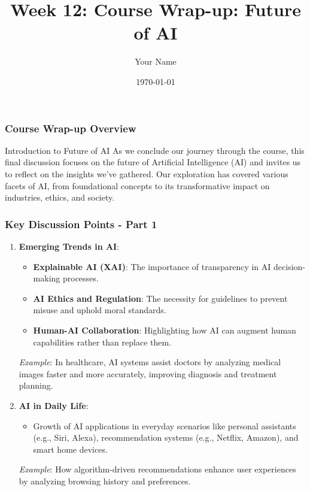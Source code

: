 \documentclass{beamer}
\title{Week 12: Course Wrap-up: Future of AI}
\author{Your Name}
\institute{Your Institution}
\date{\today}
\begin{document}
\frame{\titlepage}

\begin{frame}[fragile]
    \frametitle{Course Wrap-up Overview}
    \begin{block}{Introduction to Future of AI}
        As we conclude our journey through the course, this final discussion focuses on the future of Artificial Intelligence (AI) and invites us to reflect on the insights we’ve gathered. 
        Our exploration has covered various facets of AI, from foundational concepts to its transformative impact on industries, ethics, and society.
    \end{block}
\end{frame}

\begin{frame}[fragile]
    \frametitle{Key Discussion Points - Part 1}
    \begin{enumerate}
        \item \textbf{Emerging Trends in AI}:
            \begin{itemize}
                \item \textbf{Explainable AI (XAI)}: The importance of transparency in AI decision-making processes.
                \item \textbf{AI Ethics and Regulation}: The necessity for guidelines to prevent misuse and uphold moral standards.
                \item \textbf{Human-AI Collaboration}: Highlighting how AI can augment human capabilities rather than replace them.
            \end{itemize}
            \textit{Example}: In healthcare, AI systems assist doctors by analyzing medical images faster and more accurately, improving diagnosis and treatment planning.
        \item \textbf{AI in Daily Life}:
            \begin{itemize}
                \item Growth of AI applications in everyday scenarios like personal assistants (e.g., Siri, Alexa), recommendation systems (e.g., Netflix, Amazon), and smart home devices.
            \end{itemize}
            \textit{Example}: How algorithm-driven recommendations enhance user experiences by analyzing browsing history and preferences.
    \end{enumerate}
\end{frame}
\end{document}
